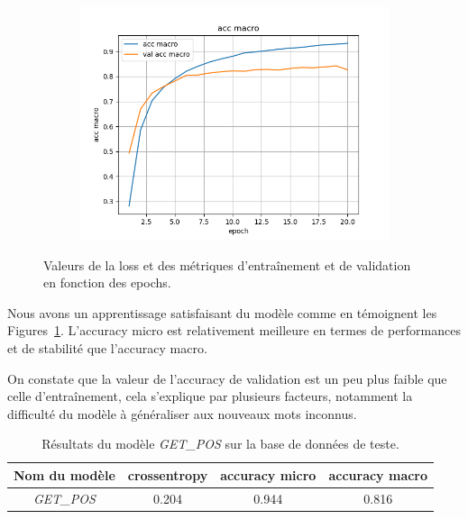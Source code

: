 \documentclass[a4paper]{article}
\begin{document}
\begin{figure}[H]
\begin{subfigure}{0.32\textwidth}
    \end{subfigure}
    \begin{subfigure}{0.32\textwidth}
        \centering
        \includegraphics[width=\linewidth]{../logs/get_pos/acc macro.png}
    \end{subfigure}
    \caption{Valeurs de la loss et des métriques d'entraînement et de validation en fonction des epochs.}
    \label{fig: train getpos}
\end{figure}

Nous avons un apprentissage satisfaisant du modèle comme en témoignent les Figures~\ref{fig: train getpos}. 
L'accuracy micro est relativement meilleure en termes de performances et de stabilité que l'accuracy macro.

On constate que la valeur de l'accuracy de validation est un peu plus faible que celle d'entraînement, cela 
s'explique par plusieurs facteurs, notamment la difficulté du modèle à généraliser aux nouveaux mots inconnus.


\begin{table}[H]
    \centering
    \begin{tabular}{|c|c|c|c|}
        \hline
        Nom du modèle & crossentropy & accuracy micro & accuracy macro \\
        \hline
        \textit{GET\_POS} & 0.204 & 0.944 & 0.816\\
        \hline
    \end{tabular}
    \caption{Résultats du modèle \textit{GET\_POS} sur la base de données de teste.}
    \label{tab:test getpos}
\end{table}
\end{document}
